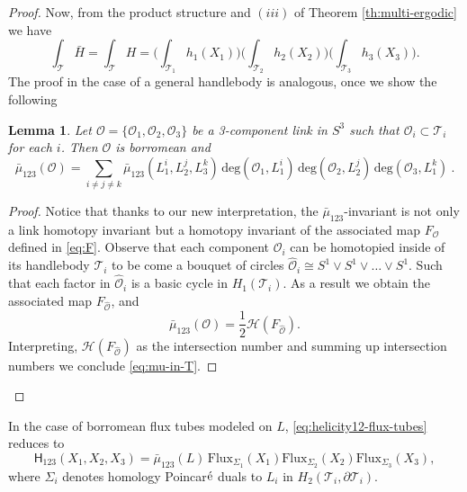 \documentclass[12pt]{article}
\newtheorem{lemma}[theorem]{Lemma}
\newcommand{\no}{\noindent}
\begin{document}
\begin{proof}
\no Now, from the product structure and $(iii)$ of Theorem \ref{th:multi-ergodic} we have
 \[
  \int_\mathcal{T} \bar{H} =\int_\mathcal{T} H=\bigl(\int_{\mathcal{T}_1} h_1(X_1) \bigr)\bigl(\int_{\mathcal{T}_2} h_2(X_2) \bigr)\bigl(\int_{\mathcal{T}_3} h_3(X_3) \bigr).
 \]
The proof in the case of a general handlebody is analogous, once we show the following 
\begin{lemma}
 Let $\mathcal{O}=\{\mathcal{O}_1,\mathcal{O}_2, \mathcal{O}_3\}$ be a 3-component link in $S^3$ such that 
 $\mathcal{O}_i\subset \mathcal{T}_i$ for each $i$. Then $\mathcal{O}$ is borromean and 
  \begin{equation}\label{eq:mu-in-T}
 \bar{\mu}_{123}(\mathcal{O})=\sum_{i\neq j\neq k} \bar{\mu}_{123}(L^i_1, L^j_2, L^k_3)\,\text{deg}(\mathcal{O}_1, L^i_1)\,\text{deg}(\mathcal{O}_2, L^j_2)\,\text{deg}(\mathcal{O}_3, L^k_1)\ .
 \end{equation}
\end{lemma}
\begin{proof}
 Notice that thanks to our new interpretation, the $\bar{\mu}_{123}$-invariant is not only a link homotopy 
 invariant but a homotopy invariant of the associated map $F_{\mathcal{O}}$ defined in \eqref{eq:F}. Observe that  each component 
 $\mathcal{O}_i$ can be homotopied inside of its handlebody $\mathcal{T}_i$ to be come a bouquet of circles $\widehat{\mathcal{O}}_i\cong S^1\vee S^1\vee\ldots\vee S^1$. Such that each factor in $\widehat{\mathcal{O}}_i$ is a basic cycle in $H_1(\mathcal{T}_i)$. As a result we obtain the associated map
 $F_{\widehat{\mathcal{O}}}$, and
 \[
  \bar{\mu}_{123}(\mathcal{O})=\frac{1}{2}\mathscr{H}(F_{\widehat{\mathcal{O}}}).
 \]
 Interpreting, $\mathscr{H}(F_{\widehat{\mathcal{O}}})$ as the intersection number and summing up
 intersection numbers we conclude \eqref{eq:mu-in-T}.
\end{proof}

\end{proof}

\no In the case of borromean flux tubes modeled on $L$, \eqref{eq:helicity12-flux-tubes} reduces to
\begin{equation}\label{eq:helicity12-borro-flux-tubes}
\mathsf{H}_{123}(X_1,X_2,X_3)=\bar{\mu}_{123}(L)\,\text{Flux}_{\Sigma_1}(X_1)
\text{Flux}_{\Sigma_2}(X_2)\text{Flux}_{\Sigma_3}(X_3),
\end{equation}
where $\Sigma_i$ denotes homology Poincar$\acute{\rm e}$ duals to $L_i$ in $H_2(\mathcal{T}_i,\partial\mathcal{T}_i)$.
\end{document}
